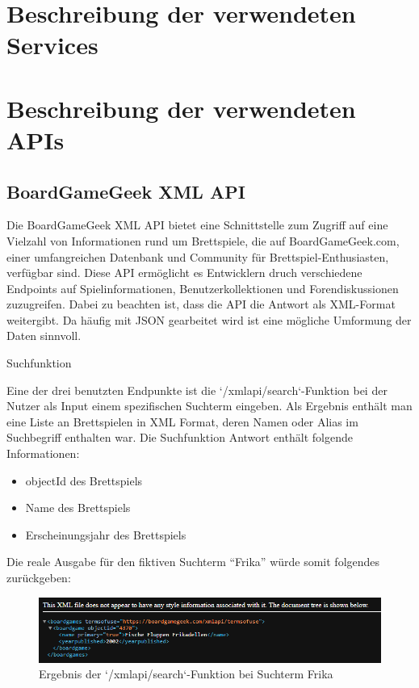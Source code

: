 \section{Beschreibung der verwendeten Services}


\section{Beschreibung der verwendeten APIs}
\subsection{BoardGameGeek XML API }

Die BoardGameGeek XML API bietet eine Schnittstelle zum Zugriff auf eine Vielzahl von Informationen rund um Brettspiele,
die auf BoardGameGeek.com, einer umfangreichen Datenbank und Community für Brettspiel-Enthusiasten,
verfügbar sind. Diese API ermöglicht es Entwicklern druch verschiedene Endpoints auf Spielinformationen,
Benutzerkollektionen und Forendiskussionen zuzugreifen. Dabei zu beachten ist, dass die API die Antwort als XML-Format weitergibt. 
Da häufig mit JSON gearbeitet wird ist eine mögliche Umformung der Daten sinnvoll.

\large Suchfunktion

Eine der drei benutzten Endpunkte ist die `/xmlapi/search`-Funktion bei der Nutzer als Input einem spezifischen Suchterm eingeben.
Als Ergebnis enthält man eine Liste an Brettspielen in XML Format, deren Namen oder Alias im Suchbegriff enthalten war.
Die Suchfunktion Antwort enthält folgende Informationen:
\begin{itemize}
    \item {objectId des Brettspiels}
    \item {Name des Brettspiels}
    \item {Erscheinungsjahr des Brettspiels}
\end{itemize}

Die reale Ausgabe für den fiktiven Suchterm ``Frika'' würde somit folgendes zurückgeben: 
\begin{figure}[h]
    \centering
    \includegraphics[width=1\textwidth]{graphics/Search_API.png}
    \caption{Ergebnis der `/xmlapi/search`-Funktion bei Suchterm Frika}
    \label{fig:Search_API}
\end{figure}

